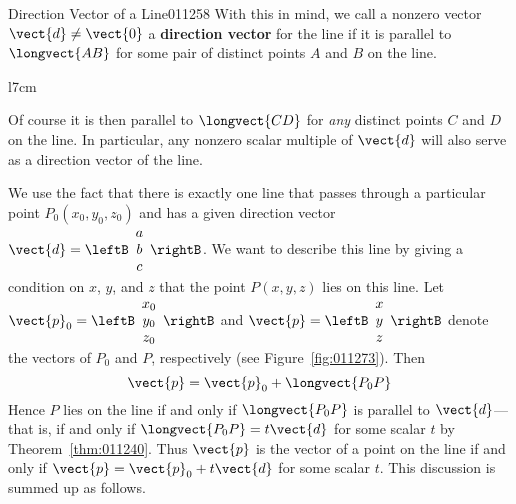 \begin{definition}{Direction Vector of a Line}{011258}
With this in mind, we call a nonzero vector $\vect{d} \neq \vect{0}$ a \textbf{direction vector} for the line if it is parallel to $\longvect{AB}$ for some pair of distinct points $A$ and $B$ on the line.
\end{definition}

\begin{wrapfigure}[7]{l}{7cm} 
	\centering
	
	\caption{\label{fig:011273}}
\end{wrapfigure}

\noindent Of course it is then parallel to $\longvect{CD}$ for \textit{any} distinct points $C$ and $D$ on the line. In particular, any nonzero scalar multiple of $\vect{d}$ will also serve as a direction vector of the line.


We use the fact that there is exactly one line that passes through a particular point $P_{0}(x_{0}, y_{0}, z_{0})$ and has a given direction vector 
$\vect{d} = \leftB
\begin{array}{c}
a \\
b \\
c  
\end{array}
\rightB$. We want to describe this line by giving a condition on $x$, $y$, and $z$ that the point $P(x, y, z)$ lies on this line. Let 
$\vect{p}_{0} = \leftB
\begin{array}{c}
x_{0} \\
y_{0} \\
z_{0}  
\end{array}
\rightB$ 
and 
$\vect{p} = \leftB
\begin{array}{c}
x \\
y \\
z  
\end{array}
\rightB$ denote the vectors of $P_{0}$ and $P$, respectively (see Figure~\ref{fig:011273}). Then
\begin{equation*}
\vect{p} = \vect{p}_{0} + \longvect{P_{0}P}
\end{equation*}
Hence $P$ lies on the line if and only if $\longvect{P_{0}P}$ is parallel to $\vect{d}$---that is, if and only if $\longvect{P_{0}P} = t\vect{d}$ for some scalar $t$ by Theorem~\ref{thm:011240}. Thus $\vect{p}$ is the vector of a point on the line if and only if $\vect{p} = \vect{p}_{0} + t\vect{d}$ for some scalar $t$. This discussion is summed up as follows.


